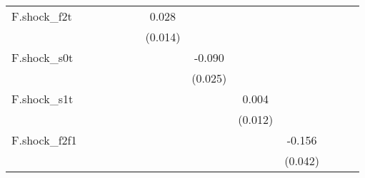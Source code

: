 {\begin{tabular}{l*{12}{c}}
\addlinespace
F.shock\_f2t &                     &                     &                     &                     &                     &       0.028\sym{*}  &                     &                     &                     &                     &                     &                     \\
            &                     &                     &                     &                     &                     &     (0.014)         &                     &                     &                     &                     &                     &                     \\
\addlinespace
F.shock\_s0t &                     &                     &                     &                     &                     &                     &      -0.090\sym{***}&                     &                     &                     &                     &                     \\
            &                     &                     &                     &                     &                     &                     &     (0.025)         &                     &                     &                     &                     &                     \\
\addlinespace
F.shock\_s1t &                     &                     &                     &                     &                     &                     &                     &       0.004         &                     &                     &                     &                     \\
            &                     &                     &                     &                     &                     &                     &                     &     (0.012)         &                     &                     &                     &                     \\
\addlinespace
F.shock\_f2f1&                     &                     &                     &                     &                     &                     &                     &                     &      -0.156\sym{***}&                     &                     &                     \\
            &                     &                     &                     &                     &                     &                     &                     &                     &     (0.042)         &                     &                     &                     \\

\end{tabular}}
